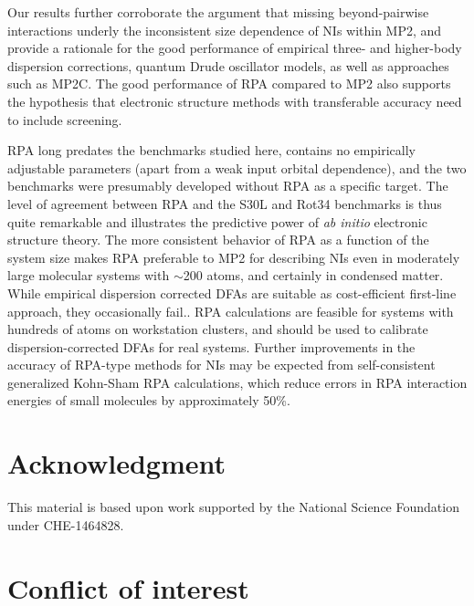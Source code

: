 \documentclass[twoside,twocolumn,9pt]{article}
\begin{document}
Our results further corroborate the argument that missing beyond-pairwise
interactions underly the inconsistent size dependence of NIs within
MP2, and provide a rationale for the good performance of empirical
three- and higher-body dispersion corrections,\cite{Tkatchenko12PhysRevLett108p236402,
  Grimme12ChemEurJ18p9955,DiStasio12ProcNatlAcadSciUSA109p14791} quantum
Drude oscillator models,\cite{Sommerfeld08JPhysChemA112p11021}
as well as approaches such as MP2C.\cite{Pitonak10JChemTheoryComput6p168}
The good performance of RPA compared to MP2 also supports the hypothesis
that electronic structure methods with transferable accuracy need to
include screening.\cite{Bates13JChemPhys139p171103}

RPA long predates the benchmarks studied here, contains no empirically
adjustable parameters (apart from a weak input orbital dependence), and
the two benchmarks were presumably developed without RPA as a specific
target. The level of agreement between RPA and the S30L and Rot34
benchmarks is thus quite remarkable and illustrates the predictive power
of {\it ab initio} electronic structure theory. The more consistent
behavior of RPA as a function of the system size makes RPA preferable to
MP2 for describing NIs even in  moderately large molecular systems with
$\sim$200 atoms, and certainly in condensed matter. While empirical
dispersion corrected DFAs are suitable as cost-efficient first-line
approach, they occasionally fail.\cite{Kim16JPhysChemLett, 
  Hesselmann11PhysChemChemPhys13p732}. RPA calculations are feasible for
systems with hundreds of atoms on workstation
clusters,\cite{Hesselmann12PhysRevA85p012517, Riplinger13JChemPhys,
Kallay15JChemPhys142p204105, Chen17AnnuRevPhysChem68p421, 
Schurkus16JChemPhys144p031101}
and should be used to calibrate dispersion-corrected DFAs 
for real systems. Further improvements in the accuracy of RPA-type
methods for NIs may be expected from self-consistent generalized Kohn-Sham
RPA calculations,\cite{voora17} which reduce errors in RPA interaction
energies of small molecules by approximately 50\%. 


\section*{Acknowledgment}
This material is based upon work supported by
  the National Science Foundation under CHE-1464828.

\section*{Conflict of interest}
\end{document}
